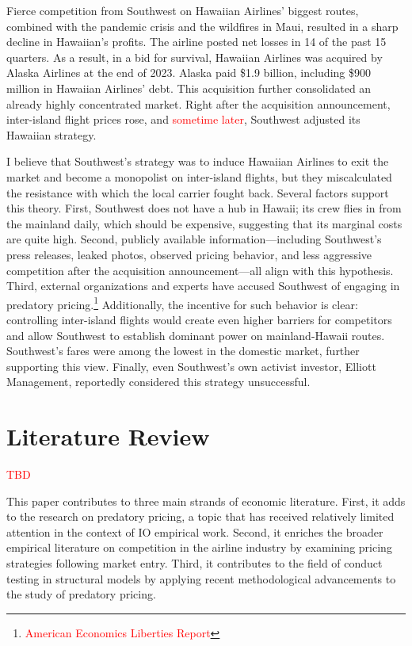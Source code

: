 \documentclass[12pt,oneside]{article}
\theoremstyle{definition}
\theoremstyle{remark}
\begin{document}
 Fierce competition from Southwest on Hawaiian Airlines’ biggest routes, combined with the pandemic crisis and the wildfires in Maui, resulted in a sharp decline in Hawaiian’s profits. The airline posted net losses in 14 of the past 15 quarters. As a result, in a bid for survival, Hawaiian Airlines was acquired by Alaska Airlines at the end of 2023. Alaska paid \$1.9 billion, including \$900 million in Hawaiian Airlines’ debt. This acquisition further consolidated an already highly concentrated market. Right after the acquisition announcement, inter-island flight prices rose, and \textcolor{red}{sometime later}, Southwest adjusted its Hawaiian strategy.

 I believe that Southwest’s strategy was to induce Hawaiian Airlines to exit the market and become a monopolist on inter-island flights, but they miscalculated the resistance with which the local carrier fought back. Several factors support this theory. First, Southwest does not have a hub in Hawaii; its crew flies in from the mainland daily, which should be expensive, suggesting that its marginal costs are quite high. Second, publicly available information—including Southwest’s press releases, leaked photos, observed pricing behavior, and less aggressive competition after the acquisition announcement—all align with this hypothesis. Third, external organizations and experts have accused Southwest of engaging in predatory pricing.\footnote{\textcolor{red}{American Economics Liberties Report}} Additionally, the incentive for such behavior is clear: controlling inter-island flights would create even higher barriers for competitors and allow Southwest to establish dominant power on mainland-Hawaii routes. Southwest’s fares were among the lowest in the domestic market, further supporting this view. Finally, even Southwest’s own activist investor, Elliott Management, reportedly considered this strategy unsuccessful.


\section{Literature Review}

\textcolor{red}{TBD}

This paper contributes to three main strands of economic literature. First, it adds to the research on predatory pricing, a topic that has received relatively limited attention in the context of IO empirical work. Second, it enriches the broader empirical literature on competition in the airline industry by examining pricing strategies following market entry. Third, it contributes to the field of conduct testing in structural models by applying recent methodological advancements to the study of predatory pricing.
\end{document}
